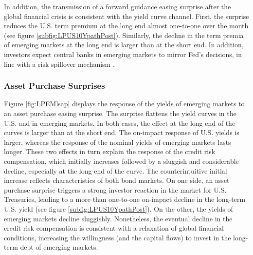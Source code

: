 {In addition, the transmission of a forward guidance easing surprise after the global financial crisis is consistent with the yield curve channel.
First, the surprise reduces the U.S. term premium at the long end almost one-to-one over the month (see figure \ref{subfig:LPUS10YpathPost}). 
Similarly, the decline in the term premia of emerging markets at the long end is larger than at the short end.
In addition, investors expect central banks in emerging markets to mirror Fed's decisions, in line with a risk spillover mechanism \citep{Kalemli-Ozcan:2019}.


\subsubsection{Asset Purchase Surprises}
\iftoggle{toclinks}{\gototoc}{} %

Figure \ref{fig:LPEMlsap} displays the response of the yields of emerging markets to an asset purchase easing surprise.
The surprise flattens the yield curves in the U.S. and in emerging markets.
In both cases, the effect at the long end of the curves is larger than at the short end.
The on-impact response of U.S. yields is larger, whereas the response of the nominal yields of emerging markets lasts longer.
These two effects in turn explain the response of the credit risk compensation, which %
initially increases followed by a sluggish and considerable decline, especially at the long end of the curve.
The counterintuitive initial increase %
reflects characteristics of both bond markets. %
On one side, an asset purchase surprise triggers a strong investor reaction in the market for U.S. Treasuries, leading to a  more than one-to-one on-impact decline in the long-term U.S. yield (see figure \ref{subfig:LPUS10YpathPost}).
On the other, the yields of emerging markets decline sluggishly.
Nonetheless, the eventual decline in the credit risk compensation is consistent with a relaxation of global financial conditions, increasing the willingness (and the capital flows) to invest in the long-term debt of emerging markets. 

}
